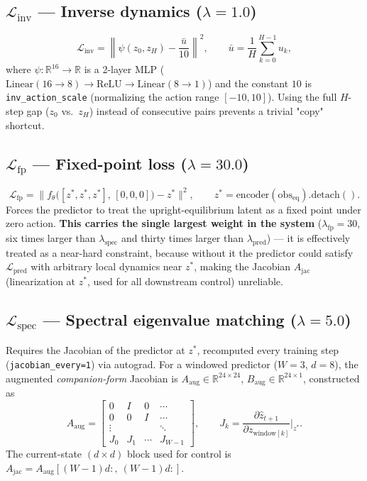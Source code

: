 \documentclass[11pt]{article}
\newcommand{\R}{\mathbb{R}}
\newcommand{\loss}[1]{\mathcal{L}_{\text{#1}}}
\newcommand{\zstar}{z^{*}}
\begin{document}
\subsection{$\loss{inv}$ --- Inverse dynamics \quad ($\lambda = 1.0$)}
\begin{equation}
\loss{inv} = \left\| \psi(z_0, z_H) - \frac{\bar u}{10} \right\|^2,
\qquad \bar u = \frac{1}{H}\sum_{k=0}^{H-1} u_k,
\end{equation}
where $\psi : \R^{16} \to \R$ is a 2-layer MLP
($\text{Linear}(16{\to}8) \to \text{ReLU} \to \text{Linear}(8{\to}1)$) and the
constant $10$ is \texttt{inv\_action\_scale} (normalizing the action range
$[-10,10]$). Using the full $H$-step gap ($z_0$ vs.\ $z_H$) instead of
consecutive pairs prevents a trivial "copy" shortcut.

\subsection{$\loss{fp}$ --- Fixed-point loss \quad ($\lambda = 30.0$)}
\begin{equation}
\loss{fp} = \big\| f_\theta\big([\zstar, \zstar, \zstar],\, [0,0,0]\big) - \zstar \big\|^2,
\qquad \zstar = \text{encoder}(\text{obs}_{\text{eq}}).\text{detach}().
\end{equation}
Forces the predictor to treat the upright-equilibrium latent as a fixed point
under zero action. \textbf{This carries the single largest weight in the
system} ($\lambda_{\text{fp}} = 30$, six times larger than $\lambda_{\text{spec}}$
and thirty times larger than $\lambda_{\text{pred}}$) — it is effectively
treated as a near-hard constraint, because without it the predictor could
satisfy $\loss{pred}$ with arbitrary local dynamics near $\zstar$, making the
Jacobian $A_{\text{jac}}$ (linearization at $\zstar$, used for all downstream
control) unreliable.

\subsection{$\loss{spec}$ --- Spectral eigenvalue matching \quad ($\lambda = 5.0$)}

Requires the Jacobian of the predictor at $\zstar$, recomputed every training
step (\texttt{jacobian\_every=1}) via autograd. For a windowed predictor
($W=3$, $d=8$), the augmented \emph{companion-form} Jacobian is
$A_{\text{aug}} \in \R^{24 \times 24}$, $B_{\text{aug}} \in \R^{24 \times 1}$,
constructed as
\begin{equation}
A_{\text{aug}} =
\begin{bmatrix}
0      & I      & 0      & \cdots \\
0      & 0      & I      & \cdots \\
\vdots &        &        & \ddots \\
J_0    & J_1    & \cdots & J_{W-1}
\end{bmatrix},
\qquad
J_k = \frac{\partial \hat z_{t+1}}{\partial z_{\text{window}[k]}} \bigg|_{\zstar}.
\end{equation}
The current-state $(d \times d)$ block used for control is
$A_{\text{jac}} = A_{\text{aug}}[(W{-}1)d{:},\ (W{-}1)d{:}]$.
\end{document}

